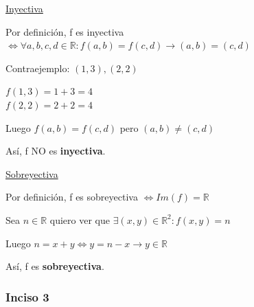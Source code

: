 \underline{Inyectiva}

Por definición, f es inyectiva $\iff \forall a,b,c,d \in \mathbb{R}: f(a,b) = f(c,d) \rightarrow (a,b) = (c,d)$

Contraejemplo: $(1,3), (2,2)$

$f(1,3) = 1+3 = 4$ \\
$f(2,2) = 2+2 = 4$

Luego $f(a,b) = f(c,d)$ pero $(a,b) \neq (c,d)$

Así, f NO es \textbf{inyectiva}.

\underline{Sobreyectiva}

Por definición, f es sobreyectiva $\iff Im(f) = \mathbb{R}$

Sea $n \in \mathbb{R}$ quiero ver que $\exists (x,y) \in \mathbb{R}^2: f(x,y) = n$

Luego $n = x+y \iff y = n-x \rightarrow y \in \mathbb{R}$

Así, f es \textbf{sobreyectiva}.

\subsubsection{Inciso 3}





